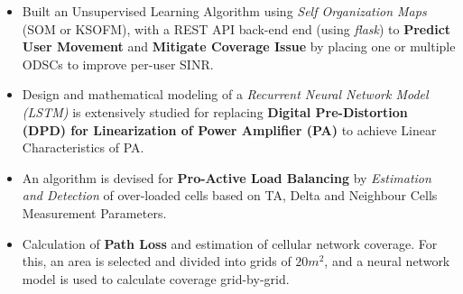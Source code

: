 \vspace{-13pt}


\vspace{-7pt}

\begin{itemize}
	\item Built an Unsupervised Learning Algorithm using \textit{Self Organization Maps} (SOM or KSOFM), with a REST API back-end end (using \textit{flask}) to \textbf{Predict User Movement} and \textbf{Mitigate Coverage Issue} by placing one or multiple ODSCs to improve per-user SINR.

	\item Design and mathematical modeling of a \textit{Recurrent Neural Network Model (LSTM)} is extensively studied for replacing \textbf{Digital Pre-Distortion (DPD) for Linearization of Power Amplifier (PA)} to achieve Linear Characteristics of PA.

	\item An algorithm is devised for \textbf{Pro-Active Load Balancing} by \textit{Estimation and Detection} of over-loaded cells based on TA, Delta and Neighbour Cells Measurement Parameters.

	\item Calculation of \textbf{Path Loss} and estimation of cellular network coverage. For this, an area is selected and divided into grids of $20 m^2$, and a neural network model is used to calculate coverage grid-by-grid.
\end{itemize}

